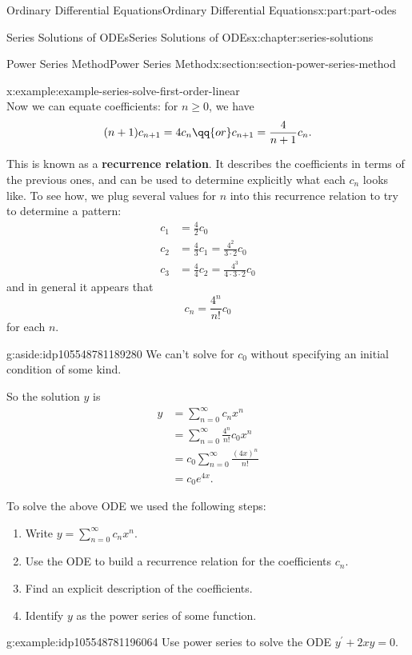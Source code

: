 \documentclass[oneside,10pt,]{book}
\newcommand{\terminology}[1]{\textbf{#1}}
\numberwithin{equation}{part}
\newcommand{\amp}{&}
\begin{document}
\begin{partptx}{Ordinary Differential Equations}{}{Ordinary Differential Equations}{}{}{x:part:part-odes}
\begin{chapterptx}{Series Solutions of ODEs}{}{Series Solutions of ODEs}{}{}{x:chapter:series-solutions}
\begin{sectionptx}{Power Series Method}{}{Power Series Method}{}{}{x:section:section-power-series-method}
\begin{example}{}{x:example:example-series-solve-first-order-linear}
\begin{equation*}
\end{equation*}
Now we can equate coefficients: for \(n\geq0\), we have%
\begin{equation*}
(n+1)c_{n+1} = 4c_{n}\qq{or} c_{n+1} = \frac{4}{n+1}c_{n}.
\end{equation*}
%
\par
This is known as a \terminology{recurrence relation}. It describes the coefficients in terms of the previous ones, and can be used to determine explicitly what each \(c_{n}\) looks like. To see how, we plug several values for \(n\) into this recurrence relation to try to determine a pattern:%
\begin{align*}
c_{1} \amp= \frac{4}{2}c_{0}\\
c_{2} \amp= \frac{4}{3}c_{1} = \frac{4^{2}}{3\cdot2}c_{0}\\
c_{3} \amp= \frac{4}{4}c_{2} = \frac{4^{3}}{4\cdot3\cdot2}c_{0}
\end{align*}
and in general it appears that%
\begin{equation*}
c_{n} = \frac{4^{n}}{n!}c_{0}
\end{equation*}
for each \(n\). \begin{aside}{}{g:aside:idp105548781189280}%
We can't solve for \(c_{0}\) without specifying an initial condition of some kind.%
\end{aside}
 So the solution \(y\) is%
\begin{align*}
y \amp= \sum_{n=0}^{\infty}c_{n}x^{n}\\
\amp= \sum_{n=0}^{\infty}\frac{4^{n}}{n!}c_{0}x^{n}\\
\amp= c_{0}\sum_{n=0}^{\infty}\frac{(4x)^{n}}{n!}\\
\amp= c_{0}e^{4x}\text{.}
\end{align*}
%
\end{example}
To solve the above ODE we used the following steps:%
\begin{enumerate}
\item{}Write \(y = \sum_{n=0}^{\infty}c_{n}x^{n}\).%
\item{}Use the ODE to build a recurrence relation for the coefficients \(c_{n}\).%
\item{}Find an explicit description of the coefficients.%
\item{}Identify \(y\) as the power series of some function.%
\end{enumerate}
%
\begin{example}{}{g:example:idp105548781196064}%
Use power series to solve the ODE \(y^\prime+2xy=0\).%
\par\smallskip%

\end{example}
\end{sectionptx}
\end{chapterptx}
\end{partptx}
\end{document}
